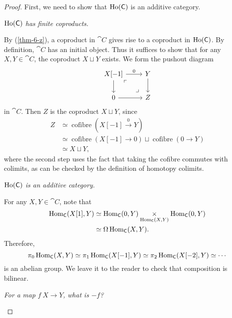 \begin{proof}
    First, we need to show that $\operatorname{Ho}(\mathsf{C})$ is an additive category.

    \begin{itms}
        \item \emph{$\operatorname{Ho}(\mathsf{C})$ has finite coproducts.}
        
        By (\ref{thm-6-z}), a coproduct in $\cat C$ gives rise to a coproduct in $\operatorname{Ho}(\mathsf{C})$.
        By definition, $\cat C$ has an initial object.
        Thus it suffices to show that for any $X,Y\in\cat C$, the coproduct $X\sqcup Y$ exists.
        We form the pushout diagram 
        \[ \begin{tikzcd}
            X[-1]\ar[r,"0"]\ar[d]\ar[dr,phantom,"\ulcorner" pos=.15,"\lrcorner" pos=.75] & Y\ar[d] \\
            0\ar[r] & Z
        \end{tikzcd} \]
        in $\cat C$. Then $Z$ is the coproduct $X\sqcup Y$, since
        \[ \begin{aligned}
            Z &\simeq \operatorname{cofibre}(X[-1]\xrightarrow0Y) \\
            &\simeq \operatorname{cofibre}(X[-1]\to0)\sqcup\operatorname{cofibre}(0\to Y) \\
            &\simeq X\sqcup Y,
        \end{aligned} \]
        where the second step uses the fact that taking the cofibre 
        commutes with colimits,
        as can be checked by the definition of homotopy colimits.

        \item \emph{$\operatorname{Ho}(\mathsf{C})$ is an additive category.}
        
        For any $X,Y\in\cat{C}$, note that 
        \[\begin{aligned}
            \operatorname{Hom}_{\mathsf{C}}(X[1],Y)
            &\simeq \operatorname{Hom}_{\mathsf{C}}(0,Y) \underset{\operatorname{Hom}_{\mathsf{C}}(X,Y)}{\times} \operatorname{Hom}_{\mathsf{C}}(0,Y) \\
            &\simeq \Omega\operatorname{Hom}_{\mathsf{C}}(X,Y).
        \end{aligned}\]
        Therefore,
        \[
            \pi_0\operatorname{Hom}_{\mathsf{C}}(X,Y)\simeq 
            \pi_1\operatorname{Hom}_{\mathsf{C}}(X[-1],Y)\simeq 
            \pi_2\operatorname{Hom}_{\mathsf{C}}(X[-2],Y)\simeq\cdots
        \]
        is an abelian group.
        We leave it to the reader to check that 
        composition is bilinear.

        \item \emph{For a map $f\:X\to Y$, what is $-f$?}
        

\end{itms}
\end{proof}
